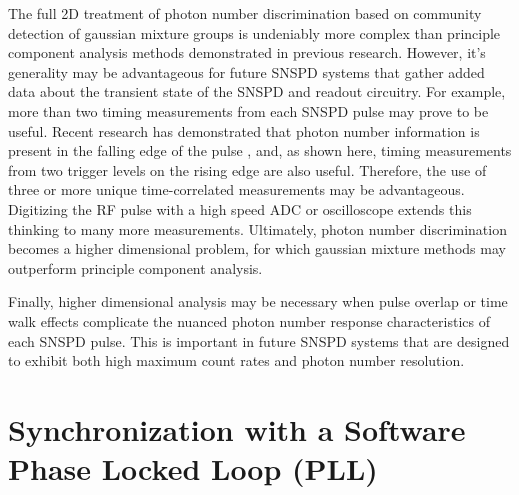 \documentclass[11pt]{caltech_thesis} %
\begin{document}
The full 2D treatment of photon number discrimination based on community detection of gaussian mixture groups is undeniably more complex than principle component analysis methods demonstrated in previous research\autocite{sauer2023resolving,schapeler2023superconducting}. However, it's generality may be advantageous for future SNSPD systems that gather added data about the transient state of the SNSPD and readout circuitry. For example, more than two timing measurements from each SNSPD pulse may prove to be useful. Recent research has demonstrated that photon number information is present in the falling edge of the pulse \autocite{sauer2023resolving,schapeler2023superconducting}, and, as shown here, timing measurements from two trigger levels on the rising edge are also useful. Therefore, the use of three or more unique time-correlated measurements may be advantageous. Digitizing the RF pulse with a high speed ADC or oscilloscope extends this thinking to many more measurements. Ultimately, photon number discrimination becomes a higher dimensional problem, for which gaussian mixture methods may outperform principle component analysis.

Finally, higher dimensional analysis may be necessary when pulse overlap or time walk effects \autocite{Mueller2023} complicate the nuanced photon number response characteristics of each SNSPD pulse. This is important in future SNSPD systems that are designed to exhibit both high maximum count rates \autocite{Craiciu23} and photon number resolution.

\hypertarget{synchronization-with-a-software-phase-locked-loop-pll}{%
\section{Synchronization with a Software Phase Locked Loop (PLL)}\label{synchronization-with-a-software-phase-locked-loop-pll}}
\end{document}
